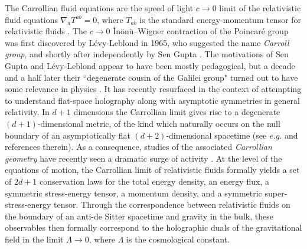 \documentclass[11pt,a4paper,reqno]{amsart}
\numberwithin{equation}{section}
\theoremstyle{definition}
\theoremstyle{remark}
\begin{document}
The Carrollian fluid equations are the speed of light $c \to 0$ limit of the relativistic fluid equations $\nabla_a T^{ab} = 0$, where $T_{ab}$ is the standard energy-momentum tensor for relativistic fluids \cite{CiambelliMarteauPetkouPetropoulosSiampos2018,PetkouPetropoulosRiveraBetancourSiampos2022,AthanasiouPetropoulosSchulzTaujanskas24a,Hartong2015,deBoerHartongObersSybesmaVandoren2018}. The $c \to 0$ \.In\"on\"u--Wigner contraction of the Poincar\'e group was first discovered by L\'evy-Leblond \cite{LevyLeblond1965} in 1965, who suggested the name \emph{Carroll group}, and shortly after independently by Sen Gupta \cite{SenGupta1966}. The motivations of Sen Gupta and L\'evy-Leblond appear to have been mostly pedagogical, but a decade and a half later their ``degenerate cousin of the Galilei group" turned out  to have some relevance in physics  
\cite{Hennaux1979}. It has recently resurfaced in the context of attempting to understand flat-space holography along with asymptotic symmetries in general relativity. In $d+1$ dimensions the Carrollian limit gives rise to a degenerate $(d+1)$-dimensional metric, of the kind which naturally occurs on the null boundary of an asymptotically flat $(d+2)$-dimensional spacetime (see \textit{e.g.} \cite{CampoleoniDelfantePekarPetropoulosRiveraBetancourVilatte2023} and references therein). As a consequence, studies of the associated \emph{Carrollian geometry} have recently seen a dramatic surge of activity  \cite{DuvalGibbonsHorvathyZhang2014,DuvalGibbonsHorvathy2014,DuvalGibbonsHorvathy2014b,BekaertMorand2016,BekaertMorand2018,Morand2020,CiambelliLeighMarteauPetropoulos2019,Herfray2022}. At the level of the equations of motion, the Carrollian limit of relativistic fluids formally yields a set of $2d + 1$ conservation laws for the total energy density, an energy flux, a symmetric stress-energy tensor, a momentum density, and a symmetric super-stress-energy tensor. Through the correspondence between relativistic fluids on the boundary of an anti-de Sitter spacetime and gravity in the bulk, these observables then formally correspond to the holographic duals of the gravitational field in the limit $\Lambda \to 0$, where $\Lambda$ is the cosmological constant. 
\end{document}
